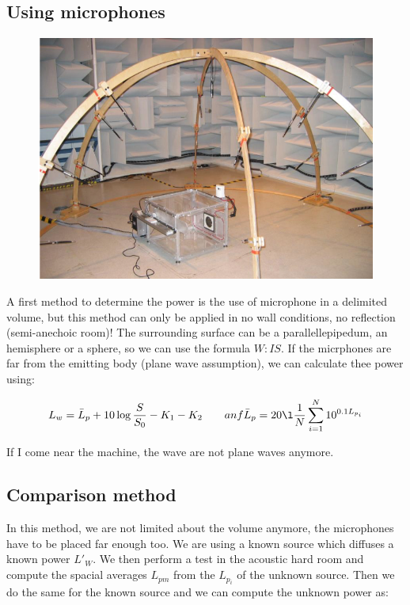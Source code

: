 \subsection{Using microphones}
	\begin{figure}
	\vspace{-5mm}
	\includegraphics[scale=0.35]{acoustics/ch3/5}
	\label{fig:3.5}
	\end{figure}
	A first method to determine the power is the use of microphone in a delimited volume, but this method can only be applied in no wall conditions, no reflection (semi-anechoic room)! The surrounding surface can be a parallellepipedum, an hemisphere or a sphere, so we can use the formula $W : IS$. If the micrphones are far from the emitting body (plane wave assumption), we can calculate thee power using: 
	
	\begin{equation}
	L_w=  \bar{L}_p + 10 \log \frac{S}{S_0} - K_1 - K_2 \qquad anf \bar{L}_p = 20 \l \frac{1}{N}\sum _{i = 1}^N 10^{0.1 L_{p_i}}
	\end{equation}

	If I come near the machine, the wave are not plane waves anymore.

\subsection{Comparison method}
	In this method, we are not limited about the volume anymore, the microphones have to be placed far enough too. We are using a known source which diffuses a known power $L'_W$. We then perform a test in the acoustic hard room and compute the spacial averages $L_{pm}$ from the $L_{p_i}$ of the unknown source. Then we do the same for the known source and we can compute the unknown power as:
	
